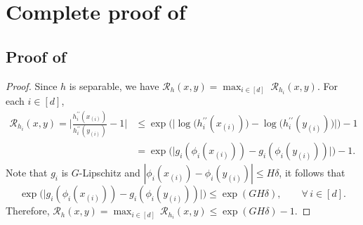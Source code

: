 \documentclass{article}
\theoremstyle{plain}
\theoremstyle{definition}
\theoremstyle{remark}
\newcommand{\sG}{G}
\newcommand{\sH}{H}
\newcommand{\cR}{\mathcal{R}}
\begin{document}
\section{Complete proof of \texorpdfstring{}{Theorem }}\label{sec:kernel verifications}
\subsection{Proof of \texorpdfstring{}{Proposition }}\label{appendix:separable kernel}
\begin{proof}
Since $h$ is separable, we have $\cR_h(x,y) = \max_{i\in[d]}\;\cR_{h_i}(x,y)$. For each $i\in[d]$,
\begin{equation*} \begin{aligned}
\cR_{h_i}(x,y) = \bigg|\frac{h_i^{\prime\prime}(x_{(i)})}{h_i^{\prime\prime}(y_{(i)})}-1 \bigg|
   &\leq \exp\Big(\big|\log\big(h_i^{\prime\prime}(x_{(i)}) \big)-\log\big(h_i^{\prime\prime}(y_{(i)}) \big) \big|\Big)-1\\
   &= \exp\Big(\big|g_i(\phi_i(x_{(i)})) - g_i(\phi_i(y_{(i)}))\big| \Big) -1 .
\end{aligned} \end{equation*}
Note that $g_i$ is $\sG$-Lipschitz and $|\phi_i(x_{(i)})-\phi_i(y_{(i)})|\leq \sH  \delta$, it follows that 
\[\exp\Big(\big|g_i(\phi_i(x_{(i)})) - g_i(\phi_i(y_{(i)}))\big| \Big) \leq \exp(\sG\sH \delta),\qquad \forall\, i\in[d].\]
Therefore, $\cR_h(x,y) = \max_{i\in[d]}\,\cR_{h_i}(x,y) \leq \exp(\sG\sH \delta)-1$.
\end{proof}
\end{document}
